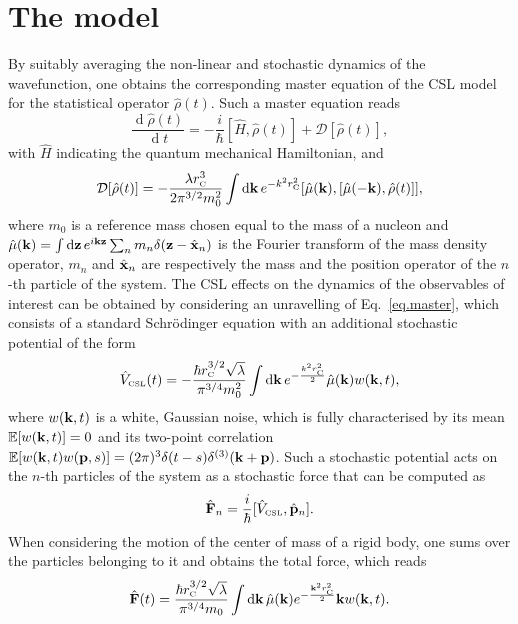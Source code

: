 \documentclass[aps,twocolumn,pra,superscriptaddress]{revtex4-2}
\newcommand\D{\operatorname{d}\!}
\renewcommand\k{{\bf k}}
\newcommand\p{{\bf p}}
\newcommand\z{{\bf z}}
\newcommand\x{{\bf x}}
\newcommand\com[2]{[#1,#2]}
\newcommand\rC{r_\text{\tiny C}}
\begin{document}
\section{The model}
By suitably averaging the non-linear and stochastic dynamics of the wavefunction, one obtains the corresponding master equation of the CSL model for the statistical operator $\hat \rho(t)$. Such a master equation reads \cite{bassi2003dynamical}
\begin{equation}\label{eq.master}
\frac{\D \hat\rho(t)}{\D t}=-\frac{i}{\hbar}\left[\hat{H},\hat{\rho}(t)\right]+\mathcal D[\hat \rho(t)],    
\end{equation}
 with $\hat H$ indicating the quantum mechanical Hamiltonian, and
\begin{equation}
    \mathcal D[\hat \rho(t)]=-\frac{\lambda \rC^3}{2\pi^{3 / 2} m_0^2} \int \D \k\, e^{-k^2 \rC^2}\com{\hat{\mu}(\k)}{\com{\hat{\mu}(-\k)}{ \hat{\rho}(t)}},
    \label{Lindblad}
\end{equation}
where $m_0$ is a reference mass chosen equal to the mass of a nucleon and $\hat{\mu}(\k)=\int \D\z \,e^{i\k \z} \sum_n m_n \delta(\z-\hat{\x}_n)$ is the Fourier transform of the mass density operator, $m_n$ and $\hat{\x}_n$ are respectively  the mass and the position operator of the $n$-th particle of the system. 
The CSL effects on the dynamics of the observables of interest can be obtained by considering an unravelling of Eq.~\eqref{eq.master}, which consists of a standard Schr\"odinger equation with an additional stochastic potential of the form \cite{fu1997spontaneous,carlesso2016experimental}
\begin{equation} 
\hat{V}_{\text{\tiny CSL}}(t)=-\frac{\hbar  \rC^{3/2} \sqrt{\lambda} }{\pi^{3 / 4} m_0^2} \int \D \k\, e^{-\frac{k^2\rC^2}{2}} \hat{\mu}(\k) w(\k, t),
\end{equation}
where $w(\k, t)$ is a white, Gaussian noise, which is fully characterised by its mean $\mathbb{E}[w(\k, t)]=0$ and its two-point correlation $\mathbb{E}[w(\k, t) w(\p, s)]= (2\pi)^{3}\delta(t-s) \delta^{(3)}(\k+\p)$. 
Such a stochastic potential acts on the $n$-th particles of the system as a stochastic force that can be computed as
\begin{equation}\label{Fn}
    \hat{\bf{F}}_n=\frac{i}{\hbar}[\hat V_{\text{\tiny CSL}},\hat{\bf {p}}_n].
\end{equation}
When considering the motion of the center of mass of a rigid body, one sums over the particles belonging to it and obtains the total force, which reads
\begin{equation}
    \hat{{\bf F}}(t)=\frac{\hbar\rC^{3 / 2} \sqrt{\lambda}}{ \pi^{3/4}  m_0} \int  \D \k \, \hat{\mu} (\k)e^{-\frac{\k^2 \rC^2}{2}}\k w(\k, t).
\end{equation}
\end{document}
